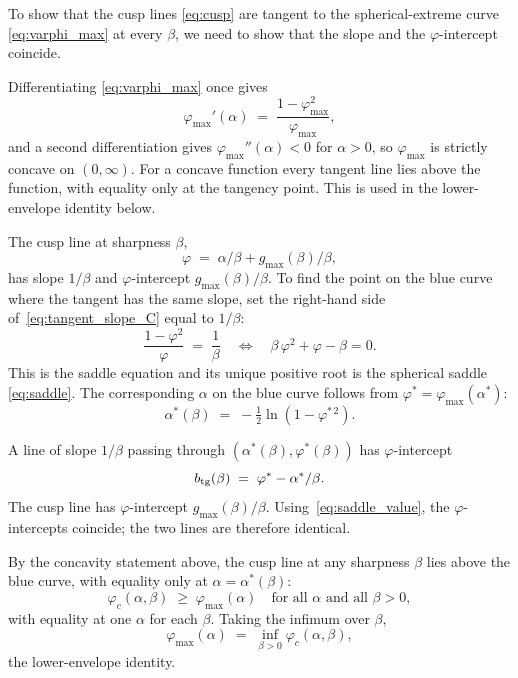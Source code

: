 \documentclass[letterpaper]{article} %
\newcommand{\Bnet}{\beta}
\begin{document}
To show that the cusp lines \eqref{eq:cusp} are tangent to the
spherical-extreme curve \eqref{eq:varphi_max} at every
$\Bnet$, we need to show that the slope and the $\varphi$-intercept
coincide.

Differentiating \eqref{eq:varphi_max} once gives
\begin{equation}
\varphi_{\max}'(\alpha) \;=\; \frac{1-\varphi_{\max}^2}{\varphi_{\max}},
\label{eq:tangent_slope_C}
\end{equation}
and a second differentiation gives $\varphi_{\max}''(\alpha) < 0$ for $\alpha > 0$,
so $\varphi_{\max}$ is strictly concave on $(0, \infty)$. For a concave function
every tangent line lies above the function, with equality only at the tangency
point. This is used in the lower-envelope identity below.

The cusp line at sharpness $\Bnet$,
\begin{equation}
\varphi \;=\; \alpha/\Bnet + g_{\max}(\Bnet)/\Bnet,
\end{equation}
has slope $1/\Bnet$ and $\varphi$-intercept $g_{\max}(\Bnet)/\Bnet$. To find the point on
the blue curve where the tangent has the same slope, set the right-hand side
of~\eqref{eq:tangent_slope_C} equal to $1/\Bnet$:
\begin{equation}
\frac{1-\varphi^2}{\varphi} \;=\; \frac{1}{\Bnet}
\quad\Longleftrightarrow\quad
\Bnet\,\varphi^2 + \varphi - \Bnet = 0.
\label{eq:saddle_eq_C}
\end{equation}
This is the saddle equation and its unique positive root is the spherical saddle \eqref{eq:saddle}.
The corresponding $\alpha$ on the blue curve follows from
$\varphi^* = \varphi_{\max}(\alpha^*)$:
\begin{equation}
\alpha^*(\Bnet) \;=\; -\tfrac12 \ln(1-\varphi^{*\,2}).
\label{eq:alpha_star_C}
\end{equation}

A line of slope $1/\Bnet$ passing through $(\alpha^*(\Bnet), \varphi^*(\Bnet))$ has
$\varphi$-intercept
\begin{equation}
b_{\rm tg}(\Bnet) \;=\; \varphi^* - \alpha^*/\Bnet.
\end{equation}
The cusp line has $\varphi$-intercept $g_{\max}(\Bnet)/\Bnet$.
Using~\eqref{eq:saddle_value}, the $\varphi$-intercepts coincide;
the two lines are therefore identical.

By the concavity statement above, the cusp line at any sharpness $\Bnet$ lies above the blue curve, with equality only at
$\alpha = \alpha^*(\Bnet)$:
\begin{equation}
\varphi_c(\alpha, \Bnet) \;\ge\; \varphi_{\max}(\alpha) \quad \text{for all $\alpha$ and all $\Bnet > 0$},
\end{equation}
with equality at one $\alpha$ for each $\Bnet$. Taking the infimum over $\Bnet$,
\begin{equation}
\varphi_{\max}(\alpha) \;=\; \inf_{\Bnet > 0} \varphi_c(\alpha, \Bnet),
\label{eq:lower_envelope_C}
\end{equation}
the lower-envelope identity.
\end{document}
